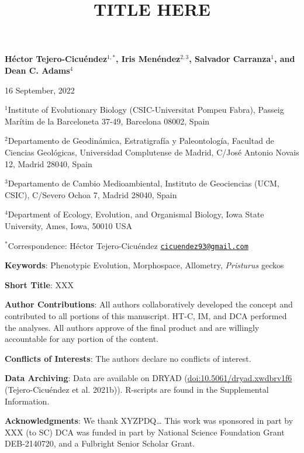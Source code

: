 \documentclass[
]{article}
\title{TITLE HERE}
\author{}
\date{\vspace{-2.5em}}
\begin{document}
\maketitle

\begin{center}
\textbf{H{\'{e}}ctor Tejero-Cicu{\'{e}}ndez$^{1,*}$,  Iris Men{\'{e}}ndez$^{2,3}$, Salvador Carranza$^{1}$, and Dean C. Adams$^{4}$} 
\end{center}

\begin{center}16 September, 2022\end{center}

\(^{1}\)Institute of Evolutionary Biology (CSIC-Universitat Pompeu
Fabra), Passeig Marítim de la Barceloneta 37-49, Barcelona 08002, Spain

\(^{2}\)Departamento de Geodinámica, Estratigrafía y Paleontología,
Facultad de Ciencias Geológicas, Universidad Complutense de Madrid,
C/José Antonio Novais 12, Madrid 28040, Spain

\(^{3}\)Departamento de Cambio Medioambiental, Instituto de Geociencias
(UCM, CSIC), C/Severo Ochoa 7, Madrid 28040, Spain

\(^{4}\)Department of Ecology, Evolution, and Organismal Biology, Iowa
State University, Ames, Iowa, 50010 USA

\(^{*}\)Correspondence: Héctor Tejero-Cicuéndez
\href{mailto:cicuendez93@gmail.com}{\nolinkurl{cicuendez93@gmail.com}}

\hfill\break

\textbf{Keywords}: Phenotypic Evolution, Morphospace, Allometry,
\emph{Pristurus} geckos \hfill\break

\textbf{Short Title}: XXX \hfill\break

\textbf{Author Contributions}: All authors collaboratively developed the
concept and contributed to all portions of this manuscript. HT-C, IM,
and DCA performed the analyses. All authors approve of the final product
and are willingly accountable for any portion of the
content.\hfill\break

\textbf{Conflicts of Interests}: The authors declare no conflicts of
interest.\hfill\break

\textbf{Data Archiving}: Data are available on DRYAD
(\url{doi:10.5061/dryad.xwdbrv1f6} (Tejero-Cicuéndez et al. 2021b)).
R-scripts are found in the Supplemental Information. \hfill\break

\textbf{Acknowledgments}: We thank XYZPDQ\ldots{} This work was
sponsored in part by XXX (to SC) DCA was funded in part by National
Science Foundation Grant DEB-2140720, and a Fulbright Senior Scholar
Grant.
\end{document}
